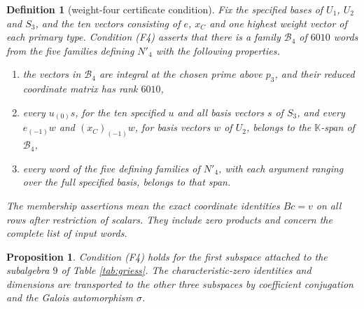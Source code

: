\documentclass[leqno]{article}
\newcommand{\K}{\ensuremath{\mathbb{K}}}
\newtheorem{defi}[thm]{Definition}
\newtheorem{prop}[thm]{Proposition}
\numberwithin{equation}{section}
\begin{document}
\begin{defi}[weight-four certificate condition]
\label{assump:weight-four}
Fix the specified bases of $U_1$, $U_2$ and $S_3$, and the ten vectors consisting of $e$, $x_C$ and one highest weight vector of each primary type. Condition \textup{(F4)} asserts that there is a family $\mathcal B_4$ of $6010$ words from the five families defining $N'_4$ with the following properties.
\begin{enumerate}
\item the vectors in $\mathcal B_4$ are integral at the chosen prime above $p_3$, and their reduced coordinate matrix has rank $6010$,
\item every $u_{(0)}s$, for the ten specified $u$ and all basis vectors $s$ of $S_3$, and every $e_{(-1)}w$ and $(x_C)_{(-1)}w$, for basis vectors $w$ of $U_2$, belongs to the $\K$-span of $\mathcal B_4$,
\item every word of the five defining families of $N'_4$, with each argument ranging over the full specified basis, belongs to that span.
\end{enumerate}
The membership assertions mean the exact coordinate identities $Bc = v$ on all rows after restriction of scalars. They include zero products and concern the complete list of input words.
\end{defi}

\begin{prop}
\label{prop:weight-four-certificate}
Condition \textup{(F4)} holds for the first subspace attached to the subalgebra $9$ of Table \ref{tab:griess}. The characteristic-zero identities and dimensions are transported to the other three subspaces by coefficient conjugation and the Galois automorphism $\sigma$.
\end{prop}
\end{document}
